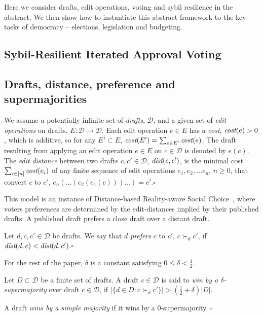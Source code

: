 \documentclass{llncs}
\newcommand{\qqed}{\hfill$\square$}
\newcommand{\calD}{\mathcal{D}}
\newcommand{\prefers}[1]{\succ_{#1}}
\newcommand{\dist}{\emph{dist}}
\newcommand{\cost}{\emph{cost}}
\begin{document}
Here we consider drafts, edit operations, voting and sybil resilience in the abstract.  We then show how to instantiate this abstract framework to  the key tasks of democracy -- elections, legislation and budgeting.


\subsection{Sybil-Resilient Iterated Approval Voting}


\subsection{Drafts, distance, preference and supermajorities}

\begin{definition}
%
We assume a potentially infinite set of \emph{drafts}, $\calD$, and a given set of \emph{edit operations} on drafts, $E: \calD \rightarrow \calD$. Each edit operation $e \in E$ has a \emph{cost}, $\cost(e) > 0$,  which is additive, so for any $E' \subset E$, $\cost(E') = \sum_{e \in E'} \cost(e)$. The draft resulting from applying an edit operation $e \in E$ on  $c \in \calD$ is denoted by $e(c)$.  The \emph{edit distance} between two drafts $c, c' \in \calD$, $\dist(c, c')$, is the minimal cost $\sum_{i \in [n]} \cost(e_i)$ of any finite sequence of edit operations $e_1, e_2, \ldots e_n$, $n \ge 0$, that convert $c$  to $c'$, $e_n(\ldots(e_2(e_1(c)))\ldots) = c'$.\qqed  
%
\end{definition}

This model is an instance of Distance-based Reality-aware Social Choice~\cite{realsoc}, where voters preferences are determined by the edit-distances implied by their published drafts:  A published draft prefers a close draft over a distant draft.

\begin{definition}[Prefers]\label{lemma:prefers}
%
Let $d, c, c' \in \calD$ be drafts.  We say that  $d$ \emph{prefers}  $c$ to $c'$, $ c \prefers{d} c'$, if $\dist(d, c) < \dist(d, c')$.\qqed
\end{definition}


For the rest of the paper, $\delta$ is a constant satisfying $0 \le \delta < \frac{1}{2}$.

\begin{definition}
%
Let $D \subset \calD$ be a finite set of drafts. A draft $c \in \calD$ is said to \emph{win by a $\delta$-supermajority} over draft  $c \in \calD$, if $|\{ d \in D : c \prefers{d} c' \}|  > (\frac{1}{2}+\delta) |D|$.


A draft \emph{wins by a simple majority} if it wins by a $0$-supermajority.
%
\qqed\end{definition}
\end{document}
